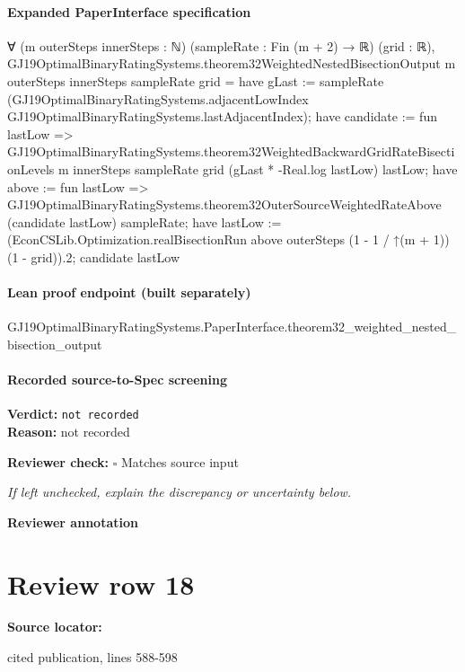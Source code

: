 \documentclass[10pt]{article}
\newcommand{\reviewerbox}{%
  \par\noindent\fbox{\parbox{0.96\linewidth}{\rule{0pt}{0.38in}}}\par
}
\newcommand{\reviewmatch}[1]{%
  \par\noindent\textbf{Reviewer check:} $\square$\; #1\par
  \noindent\emph{If left unchecked, explain the discrepancy or uncertainty below.}\par
}
\begin{document}
\paragraph{Expanded PaperInterface specification}
\begin{ReviewVerbatim}
∀ (m outerSteps innerSteps : ℕ) (sampleRate : Fin (m + 2) → ℝ) (grid : ℝ),
  GJ19OptimalBinaryRatingSystems.theorem32WeightedNestedBisectionOutput m outerSteps innerSteps sampleRate grid =
    have gLast :=
      sampleRate (GJ19OptimalBinaryRatingSystems.adjacentLowIndex GJ19OptimalBinaryRatingSystems.lastAdjacentIndex);
    have candidate := fun lastLow =>
      GJ19OptimalBinaryRatingSystems.theorem32WeightedBackwardGridRateBisectionLevels m innerSteps sampleRate grid
        (gLast * -Real.log lastLow) lastLow;
    have above := fun lastLow =>
      GJ19OptimalBinaryRatingSystems.theorem32OuterSourceWeightedRateAbove (candidate lastLow) sampleRate;
    have lastLow := (EconCSLib.Optimization.realBisectionRun above outerSteps (1 - 1 / ↑(m + 1)) (1 - grid)).2;
    candidate lastLow
\end{ReviewVerbatim}

\paragraph{Lean proof endpoint (built separately)}\begin{ReviewVerbatim}
GJ19OptimalBinaryRatingSystems.PaperInterface.theorem32_weighted_nested_bisection_output
\end{ReviewVerbatim}

\paragraph{Recorded source-to-Spec screening}
\textbf{Verdict:} \texttt{not recorded}
\\
\textbf{Reason:} not recorded
\reviewmatch{Matches source input}
\noindent\textbf{Reviewer annotation}\par
\reviewerbox
\clearpage
\hypertarget{source-claim-9c02a19f4b41b0c2}{}
\section*{Review row 18}
\textbf{Source locator:} {\footnotesize\raggedright cited publication, lines 588-\allowbreak{}598\par}
\end{document}
